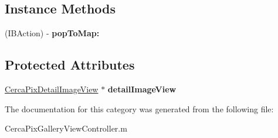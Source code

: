 \subsection*{Instance Methods}
\begin{DoxyCompactItemize}
\item 
\hypertarget{category_cerca_pix_gallery_view_controller_07_08_a8f3002ed74f3bb1c17e4952bc1057b3a}{(I\-B\-Action) -\/ {\bfseries pop\-To\-Map\-:}}\label{category_cerca_pix_gallery_view_controller_07_08_a8f3002ed74f3bb1c17e4952bc1057b3a}

\end{DoxyCompactItemize}
\subsection*{Protected Attributes}
\begin{DoxyCompactItemize}
\item 
\hypertarget{category_cerca_pix_gallery_view_controller_07_08_a85996c3bc6a2e971714412fc0a3b0f9c}{\hyperlink{interface_cerca_pix_detail_image_view}{Cerca\-Pix\-Detail\-Image\-View} $\ast$ {\bfseries detail\-Image\-View}}\label{category_cerca_pix_gallery_view_controller_07_08_a85996c3bc6a2e971714412fc0a3b0f9c}

\end{DoxyCompactItemize}


The documentation for this category was generated from the following file\-:\begin{DoxyCompactItemize}
\item 
Cerca\-Pix\-Gallery\-View\-Controller.\-m\end{DoxyCompactItemize}

